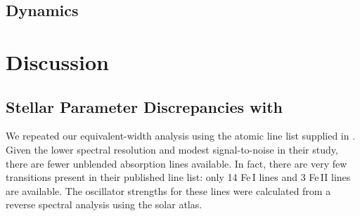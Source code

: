 \documentclass{emulateapj}
\begin{document}


\subsection{Dynamics}




\section{Discussion}




\subsection{Stellar Parameter Discrepancies with \citet{wylie-de-boer;et-al_2012}}

We repeated our equivalent-width analysis using the atomic line list supplied in \citet{wylie-de-boer;et-al_2012}. Given the lower spectral resolution and modest signal-to-noise in their study, there are fewer unblended absorption lines available. In fact, there are very few transitions present in their published line list: only 14 Fe\,I lines and 3 Fe\,II lines are available.  The oscillator strengths for these lines were calculated from a reverse spectral analysis using the \citet{Hinkle;et-al_2003} solar atlas. 






\end{document}

